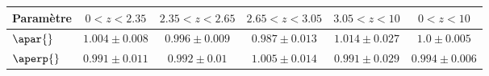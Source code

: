 \begin{table}[h]
\begin{tabular}{lccccc}
\toprule
Param\`etre  & $\num{0} < z < \num{2.35}$ & $\num{2.35} < z < \num{2.65}$ & $\num{2.65} < z < \num{3.05}$ & $\num{3.05} < z < \num{10}$  & $\num{0} < z < \num{10}$ \\
\midrule
$\apar{} $ & $ 1.004 \pm 0.008$ & $ 0.996 \pm 0.009$ & $ 0.987 \pm 0.013$ & $ 1.014 \pm 0.027$ & $ 1.0 \pm 0.005$ \\
$\aperp{} $ & $ 0.991 \pm 0.011$ & $ 0.992 \pm 0.01$ & $ 1.005 \pm 0.014$ & $ 0.991 \pm 0.029$ & $ 0.994 \pm 0.006$ \\

\end{tabular}
\end{table}
